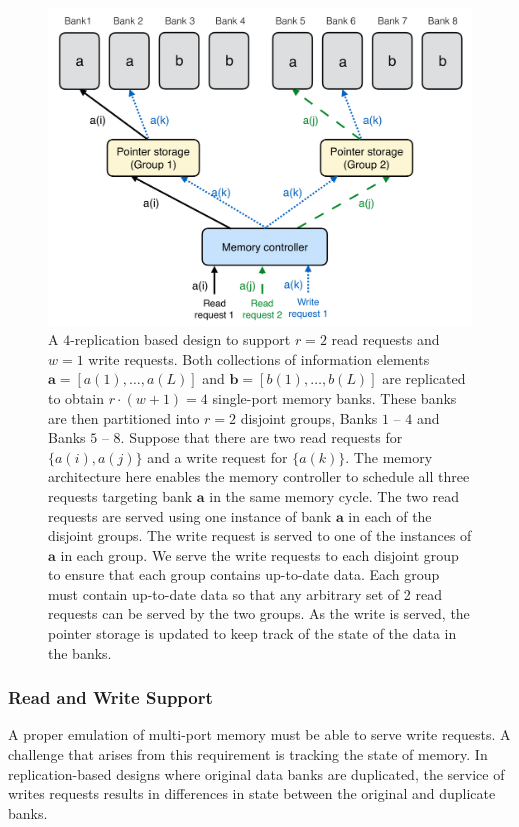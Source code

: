 \begin{figure}[t!]
\centering
\includegraphics[width=0.86\linewidth]{fig/rw-replication.pdf}
\caption{A $4$-replication based design to support $r = 2$ read requests and $w = 1$ write requests. Both collections of information elements $\mathbf{a} = [a(1),\ldots, a(L)]$ and $\mathbf{b} = [b(1),\ldots, b(L)]$ are replicated to obtain $r\cdot (w + 1) = 4$ single-port memory banks. These banks are then partitioned into $r = 2$ disjoint groups, Banks $1$ -- $4$ and Banks $5$ -- $8$. 
Suppose that there are two read requests for $\{a(i), a(j)\}$ and a write request for $\{a(k)\}$. The memory architecture here enables the memory controller to schedule all three requests targeting bank $\mathbf{a}$ in the same memory cycle. The two read requests are served using one instance of bank $\mathbf{a}$ in each of the disjoint groups. The write request is served to one of the instances of $\mathbf{a}$ in each group. We serve the write requests to each disjoint group to ensure that each group contains up-to-date data. Each group must contain up-to-date data so that any arbitrary set of 2 read requests can be served by the two groups. As the write is served, the pointer storage is updated to keep track of the state of the data in the banks.}
\label{fig:rw_replication}
\end{figure}
\subsubsection{Read and Write Support}
\label{sec:rw}
A proper emulation of multi-port memory must be able to serve  write requests. A challenge that arises from this requirement is tracking the state of memory. In replication-based designs where original data banks are duplicated, the service of writes requests results in differences in state between the original and duplicate banks.

